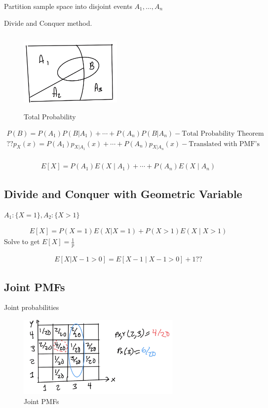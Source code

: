 Partition sample space into disjoint events $A_1, \ldots, A_n$

Divide and Conquer method.

\begin{figure}[h]
\centering
\includegraphics[width=5cm, height=4cm]{images/L02/total_prob.jpeg}
\caption{Total Probability}
\end{figure}

\begin{align*}
P(B)=P(A_1)P(B|A_1) + \cdots + P(A_n)P(B|A_n) - \text{Total Probability Theorem} \\
?? p_X(x) = P(A_1)p_{X|A_1}(x) + \cdots + P(A_n)p_{X|A_n}(x) - \text{Translated with PMF's}\\
\end{align*}

\begin{align*}
E[X]=P(A_1)E(X \mid A_1) + \cdots + P(A_n)E(X \mid A_n)
\end{align*}

\subsection{Divide and Conquer with Geometric Variable}


$A_1:\{X=1\}, A_2:\{X >1\}$

\begin{align*}
E[X]=P(X=1)E(X|X=1) + P(X > 1)E(X \mid X>1)
\end{align*}
Solve to get $E[X]=\frac{1}{p}$

\begin{align*}
E[X|X-1 >0] = E[X-1 \mid X-1>0] + 1 ??
\end{align*}

\subsection{Joint PMFs}

 Joint probabilities

\begin{figure}[h]
\centering
\includegraphics[width=8cm, height=4cm]{images/L06/joint_pmf.jpeg}
\caption{Joint PMFs}
\end{figure}
